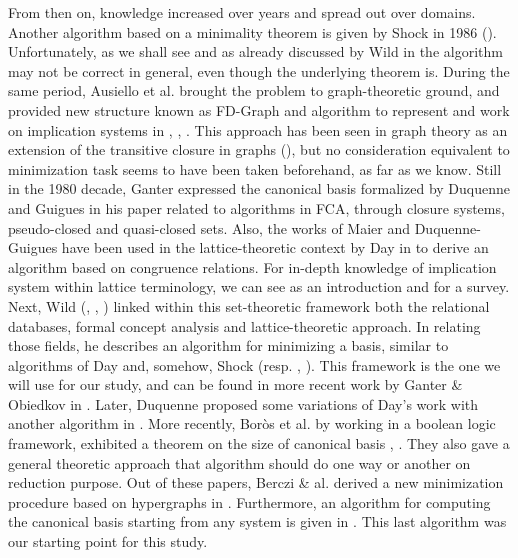 \documentclass[runningheads]{llncs}
\begin{document}
From then on, knowledge increased over years and spread out over domains. 
Another algorithm based on a minimality theorem is given by Shock in 1986 
(\cite{shock_computing_1986}). Unfortunately, as we shall see and as already 
discussed by Wild in \cite{wild_computations_1995} the algorithm may not be
correct in general, even though the underlying theorem is. During the same 
period, Ausiello et al. brought the problem to graph-theoretic ground, and 
provided new structure known as FD-Graph and algorithm to represent 
and work on implication systems in \cite{ausiello_directed_2017}, 
\cite{ausiello_graph_1983}, \cite{ausiello_minimal_1986}. This approach has been seen in graph theory as an extension of the transitive closure in graphs 
(\cite{aho_transitive_2006}), but no consideration equivalent to minimization 
task seems to have been taken beforehand, as far as we know. Still in the 1980 
decade, Ganter expressed the canonical basis formalized by Duquenne and Guigues 
in his paper related to algorithms in FCA, \cite{ganter_two_2010} through 
closure systems, pseudo-closed and quasi-closed sets. Also, the works of Maier and Duquenne-Guigues have been used in the lattice-theoretic context by Day in 
\cite{day_lattice_1992} to derive an algorithm based on congruence relations. 
For in-depth knowledge of implication system within lattice terminology, we can 
see \cite{davey_introduction_2002} as an introduction and 
\cite{bertet_lattices_2016} for a survey. Next, Wild  (\cite{wild_implicational_1989}, \cite{wild_theory_1994}, \cite{wild_computations_1995}) 
linked within this set-theoretic framework both the relational databases, 
formal concept analysis and lattice-theoretic approach. In relating those 
fields, he describes an algorithm for minimizing a basis, similar to algorithms 
of Day and, somehow, Shock (resp. \cite{day_lattice_1992},  
\cite{shock_computing_1986}). This framework is the one we will use for our 
study, and can be found in more recent work by Ganter \& Obiedkov in 
\cite{ganter_conceptual_2016}. Later, Duquenne proposed some 
variations of Day's work with another algorithm in 
\cite{duquenne_variations_2007}. More recently, Bor\`os et al. by 
working in a boolean logic framework, exhibited a theorem on the size of
canonical basis \cite{boros_exclusive_2010}, \cite{boros_strong_2017}. They also gave
a general theoretic approach that algorithm should do one way or another on
reduction purpose. Out of these papers, Berczi \& al. derived a new 
minimization procedure based on hypergraphs in \cite{berczi_directed_2017}. 
Furthermore, an algorithm for computing the canonical basis starting from any 
system is given in \cite{ganter_conceptual_2016}. This last algorithm was our starting point for this study.
\end{document}
